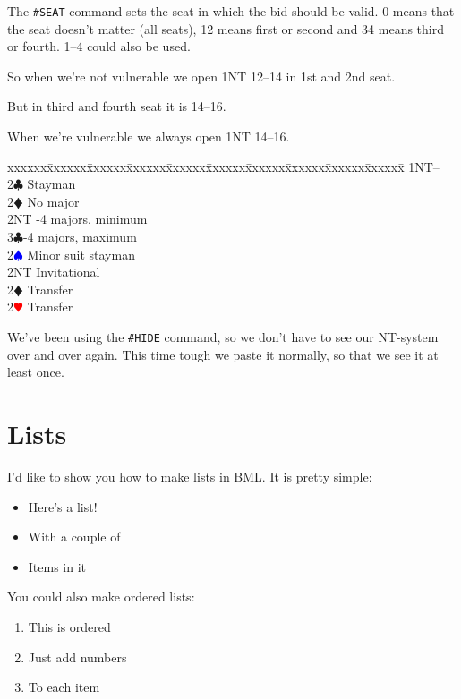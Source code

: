 \documentclass[a4paper]{article}
\newcommand{\BC}{\textcolor{OliveGreen}{$\clubsuit$}}
\newcommand{\BD}{\textcolor{RedOrange}{$\vardiamondsuit$}}
\newcommand{\BH}{\textcolor{Red}{$\varheartsuit${}}}
\newcommand{\BS}{\textcolor{Blue}{$\spadesuit${}}}
\newenvironment{bidtable}
{\begin{tabbing}

xxxxxx\=xxxxxx\=xxxxxx\=xxxxxx\=xxxxxx\=xxxxxx\=xxxxxx\=xxxxxx\=xxxxxx\=xxxxxx\=\kill}
{\end{tabbing} }%
\begin{document}
The \texttt{\#SEAT} command sets the seat in which the bid should be valid. 0
means that the seat doesn't matter (all seats), 12 means first or
second and 34 means third or fourth. 1--4 could also be used.

So when we're not vulnerable we open 1NT 12--14 in 1st and 2nd seat.

But in third and fourth seat it is 14--16.

When we're vulnerable we always open 1NT 14--16.

\begin{bidtable}
1NT--\+\\
2\BC \> Stayman\+\\
2\BD \> No major\\
2NT -4 majors, minimum\\
3\BC {}-4 majors, maximum\-\\
2\BS \> Minor suit stayman\\
2NT \> Invitational\\
2\BD \> Transfer\\
2\BH \> Transfer\-
\end{bidtable}

We've been using the \texttt{\#HIDE} command, so we don't have to see our
NT-system over and over again. This time tough we paste it
normally, so that we see it at least once.

\section{Lists}

I'd like to show you how to make lists in BML. It is pretty
simple:

\begin{itemize}
\item Here's a list!

\item With a couple of

\item Items in it

\end{itemize}

You could also make ordered lists:

\begin{enumerate}
\item This is ordered

\item Just add numbers

\item To each item

\end{enumerate}
\end{document}
